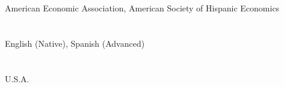 \documentclass[margin, 11pt]{res} %
\begin{document}
\begin{resume}
\section{}
American Economic Association, American Society of Hispanic Economics

\section{}
English (Native), Spanish (Advanced)

\section{}
U.S.A.\\





\section{}





\end{resume}
\end{document}
